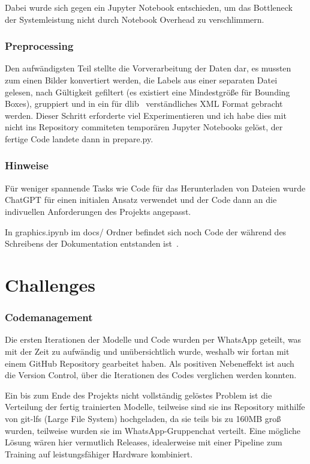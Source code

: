\documentclass[runningheads]{llncs}
\begin{document}
Dabei wurde sich gegen ein Jupyter Notebook entschieden, um das Bottleneck der Systemleistung nicht durch Notebook Overhead zu verschlimmern.

\subsubsection{Preprocessing}
Den aufwändigsten Teil stellte die Vorverarbeitung der Daten dar, es mussten zum einen Bilder konvertiert werden, die Labels aus einer separaten Datei gelesen, nach Gültigkeit gefiltert (es existiert eine Mindestgröße für Bounding Boxes), gruppiert und in ein für dlib~\cite{ref_dlib_docs} verständliches XML Format gebracht werden. Dieser Schritt erforderte viel Experimentieren und ich habe dies mit nicht ins Repository commiteten temporären Jupyter Notebooks gelöst, der fertige Code landete dann in prepare.py.

\subsubsection{Hinweise} Für weniger spannende Tasks wie Code für das Herunterladen von Dateien wurde ChatGPT für einen initialen Ansatz verwendet und der Code dann an die indivuellen Anforderungen des Projekts angepasst.

In graphics.ipynb im docs/ Ordner befindet sich noch Code der während des Schreibens der Dokumentation entstanden ist~\cite{ref_opencv_hog}.

\section{Challenges}
\subsubsection{Codemanagement} Die ersten Iterationen der Modelle und Code wurden per WhatsApp geteilt, was mit der Zeit zu aufwändig und unübersichtlich wurde, weshalb wir fortan mit einem GitHub Repository gearbeitet haben. Als positiven Nebeneffekt ist auch die Version Control, über die Iterationen des Codes verglichen werden konnten.

Ein bis zum Ende des Projekts nicht vollständig gelöstes Problem ist die Verteilung der fertig trainierten Modelle, teilweise sind sie ins Repository mithilfe von git-lfs (Large File System) hochgeladen, da sie teils bis zu 160MB groß wurden, teilweise wurden sie im WhatsApp-Gruppenchat verteilt. Eine mögliche Lösung wären hier vermutlich Releases, idealerweise mit einer Pipeline zum Training auf leistungsfähiger Hardware kombiniert.
\end{document}
